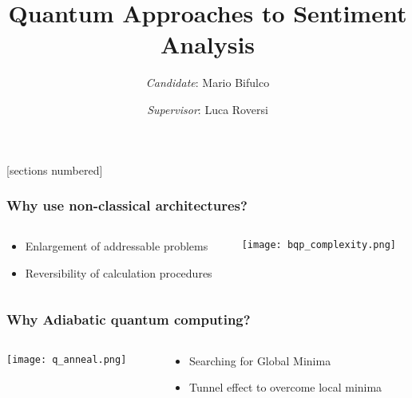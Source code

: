 \documentclass[aspectratio=169]{beamer}
\title{Quantum Approaches to Sentiment Analysis}
\author{\emph{Candidate}: Mario Bifulco}
\date{\emph{Supervisor}: Luca Roversi}
\institute{University of Turin}
\begin{document}
[sections numbered]

\begin{frame}
    \titlepage
\end{frame}

\begin{frame}\frametitle{Why use non-classical architectures?}

    \begin{columns}
        \begin{column}{0.4\textwidth}
            \begin{itemize}
                \item Enlargement of addressable problems
                \item Reversibility of calculation procedures
            \end{itemize}
        \end{column}
        \begin{column}{0.6\textwidth}
            \begin{flushright}
                \texttt{[image: bqp\_complexity.png]}
            \end{flushright}
        \end{column}
    \end{columns}

\end{frame}

\begin{frame}\frametitle{Why Adiabatic quantum computing?}

    \begin{columns}
        \begin{column}{0.6\textwidth}
            \begin{flushleft}
                \texttt{[image: q\_anneal.png]}
            \end{flushleft}
        \end{column}
        \begin{column}{0.4\textwidth}
            \begin{itemize}
                \item Searching for Global Minima
                \item Tunnel effect to overcome local minima
            \end{itemize}
        \end{column}
    \end{columns}

\end{frame}
\end{document}
